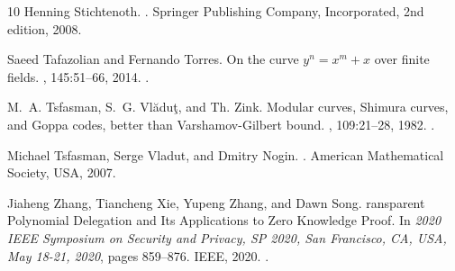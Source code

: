 \documentclass[10pt,a4paper]{article}
\theoremstyle{plain}
\theoremstyle{plain}
\theoremstyle{definition}
\theoremstyle{remark}
\theoremstyle{plain}
\begin{document}
\begin{thebibliography}{10}
{Henning} Stichtenoth.
.
\newblock Springer Publishing Company, Incorporated, 2nd edition, 2008.

Saeed {Tafazolian} and Fernando {Torres}.
\newblock On the curve $y^n = x^m + x$ over finite fields.
, 145:51--66, 2014.
\newblock \href {https://doi.org/10.1016/j.jnt.2014.05.019}
  {}.

M.~A. Tsfasman, S.~G. Vl\u{a}du\c{t}, and Th. Zink.
\newblock Modular curves, {S}himura curves, and {G}oppa codes, better than
  {V}arshamov-{G}ilbert bound.
, 109:21--28, 1982.
\newblock \href {https://doi.org/10.1002/mana.19821090103}
  {}.

Michael Tsfasman, Serge Vladut, and Dmitry Nogin.
.
\newblock American Mathematical Society, USA, 2007.

Jiaheng {Zhang}, Tiancheng {Xie}, Yupeng {Zhang}, and Dawn {Song}.
ransparent {P}olynomial {D}elegation and {I}ts {A}pplications to
  {Z}ero {K}nowledge {P}roof.
\newblock In {\em 2020 {IEEE} Symposium on Security and Privacy, {SP} 2020, San
  Francisco, CA, USA, May 18-21, 2020}, pages 859--876. {IEEE}, 2020.
\newblock \href {https://doi.org/10.1109/SP40000.2020.00052}
  {}.

\end{thebibliography}
\end{document}
